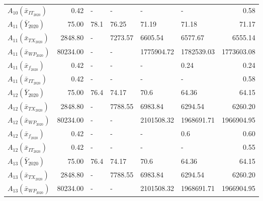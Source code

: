 \begin{tabular}{lrllllr}
$A_{10}(\bar{x}_{IT_{2020}})$ &     0.42 &                   - &                   - &                   - &                   - &                 0.58 \\
     $A_{11}(\bar{Y}_{2020})$ &    75.00 &                78.1 &               76.25 &               71.19 &               71.18 &                71.17 \\
$A_{11}(\bar{x}_{TX_{2020}})$ &  2848.80 &                   - &             7273.57 &             6605.54 &             6577.67 &              6555.14 \\
$A_{11}(\bar{x}_{WP_{2020}})$ & 80234.00 &                   - &                   - &          1775904.72 &          1782539.03 &           1773603.08 \\
 $A_{11}(\bar{x}_{f_{2020}})$ &     0.42 &                   - &                   - &                   - &                0.24 &                 0.24 \\
$A_{11}(\bar{x}_{IT_{2020}})$ &     0.42 &                   - &                   - &                   - &                   - &                 0.58 \\
     $A_{12}(\bar{Y}_{2020})$ &    75.00 &                76.4 &               74.17 &                70.6 &               64.36 &                64.15 \\
$A_{12}(\bar{x}_{TX_{2020}})$ &  2848.80 &                   - &             7788.55 &             6983.84 &             6294.54 &              6260.20 \\
$A_{12}(\bar{x}_{WP_{2020}})$ & 80234.00 &                   - &                   - &          2101508.32 &          1968691.71 &           1966904.95 \\
 $A_{12}(\bar{x}_{f_{2020}})$ &     0.42 &                   - &                   - &                   - &                 0.6 &                 0.60 \\
$A_{12}(\bar{x}_{IT_{2020}})$ &     0.42 &                   - &                   - &                   - &                   - &                 0.55 \\
     $A_{13}(\bar{Y}_{2020})$ &    75.00 &                76.4 &               74.17 &                70.6 &               64.36 &                64.15 \\
$A_{13}(\bar{x}_{TX_{2020}})$ &  2848.80 &                   - &             7788.55 &             6983.84 &             6294.54 &              6260.20 \\
$A_{13}(\bar{x}_{WP_{2020}})$ & 80234.00 &                   - &                   - &          2101508.32 &          1968691.71 &           1966904.95 \\

\end{tabular}

